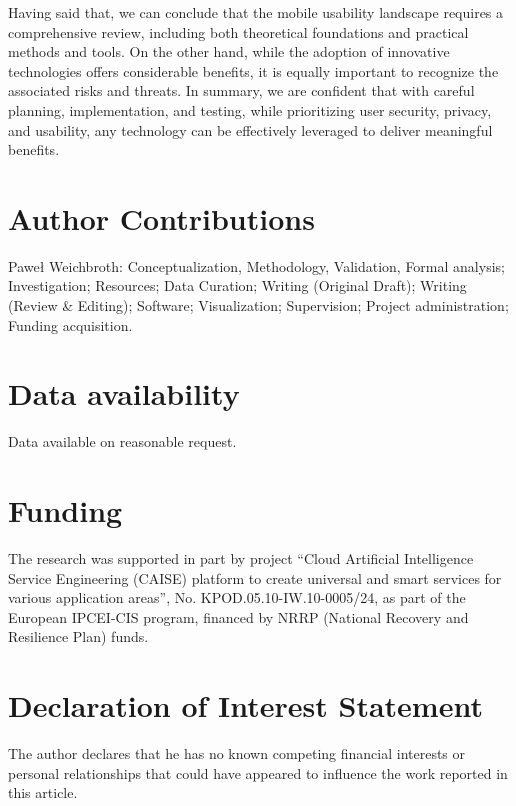 \documentclass[preprint,12pt,number]{elsarticle}
\begin{document}
Having said that, we can conclude that the mobile usability landscape requires a comprehensive review, including both theoretical foundations and practical methods and tools. On the other hand, while the adoption of innovative technologies offers considerable benefits, it is equally important to recognize the associated risks and threats. In summary, we are confident that with careful planning, implementation, and testing, while prioritizing user security, privacy, and usability, any technology can be effectively leveraged to deliver meaningful benefits.

\section*{Author Contributions}
Paweł Weichbroth: Conceptualization, Methodology, Validation, Formal analysis; Investigation; Resources; Data Curation; Writing (Original Draft); Writing (Review \& Editing); Software; Visualization; Supervision; Project administration; Funding acquisition.

\section*{Data availability}
Data available on reasonable request.

\section*{Funding}
The research was supported in part by project “Cloud Artificial Intelligence Service Engineering (CAISE) platform to create universal and smart services for various application areas”, No. KPOD.05.10-IW.10-0005/24, as part of the European IPCEI-CIS program, financed by NRRP (National Recovery and Resilience Plan) funds.


\section*{Declaration of Interest Statement}
The author declares that he has no known competing financial interests or personal relationships that could have appeared to influence the work reported in this article.
\end{document}
